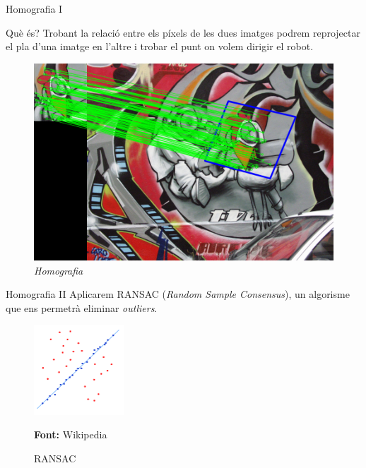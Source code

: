\documentclass[xcolor=table, 11pt]{beamer}
\newcommand*{\captionsource}[2]{%
  \caption[{#1}]{#1}\par
  \vspace{-0.4cm}
  \tiny{\textbf{Font:} #2\par}}
\newcommand\tz{\fontsize{13}{15.6}\selectfont}
\begin{document}
	\begin{frame}{Homografia I}
		\tz
		\begin{minipage}{0.62\textwidth}
			\begin{block}{Què és?}
				Trobant la relació entre els píxels de les dues imatges podrem reprojectar el pla d'una imatge en l'altre i trobar el punt on volem dirigir el robot.
			\end{block}
		\end{minipage}
		\hfill
		\begin{minipage}{0.36\textwidth}
			\begin{figure}[H]
				\vspace{0.8cm}
				\includegraphics[width=\textwidth]{images/homography}
				\caption{\textit{Homografia}}
			\end{figure}
		\end{minipage}
	\end{frame}

	\begin{frame}{Homografia II}
		Aplicarem RANSAC (\textit{Random Sample Consensus})\cite{Fischler:1981:RSC:358669.358692},
		un algorisme que ens permetrà eliminar \textit{outliers}.
		\begin{figure}[H]
			\centering
			\includegraphics[width=0.3\textwidth]{images/ransac}
			\captionsource{RANSAC}{Wikipedia}
		\end{figure}
	\end{frame}
\end{document}
